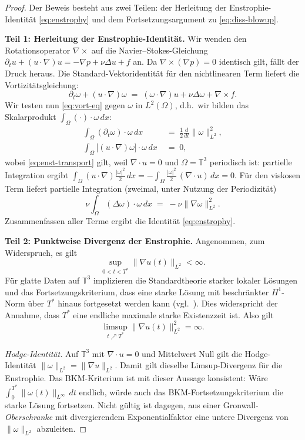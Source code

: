 \documentclass[12pt,a4paper]{article}
\theoremstyle{definition}
\theoremstyle{plain}
\theoremstyle{remark}
\begin{document}
\begin{proof}
Der Beweis besteht aus zwei Teilen: der Herleitung der Enstrophie-Identität
\eqref{eq:enstrophy} und dem Fortsetzungsargument zu \eqref{eq:diss-blowup}.

\medskip
\noindent\textbf{Teil 1: Herleitung der Enstrophie-Identität.}
Wir wenden den Rotationsoperator $\nabla\times$ auf die Navier--Stokes-Gleichung
$\partial_t u + (u\cdot\nabla)u = -\nabla p + \nu\Delta u + f$ an.
Da $\nabla\times(\nabla p) = 0$ identisch gilt, fällt der Druck heraus.
Die Standard-Vektoridentität für den nichtlinearen Term liefert die Vortizitätsgleichung:
\begin{equation}\label{eq:vort-eq}
    \partial_t \omega + (u\cdot\nabla)\omega
    \;=\; (\omega\cdot\nabla)u + \nu\Delta\omega + \nabla\times f.
\end{equation}
Wir testen nun \eqref{eq:vort-eq} gegen $\omega$ in $L^2(\Omega)$, d.h.\
wir bilden das Skalarprodukt $\int_\Omega (\cdot)\cdot\omega\,dx$:
\begin{align}
    \int_\Omega (\partial_t\omega)\cdot\omega\,dx
    &\;=\; \frac{1}{2}\frac{d}{dt}\|\omega\|_{L^2}^2, \label{eq:enst-lhs}\\[4pt]
    \int_\Omega \bigl[(u\cdot\nabla)\omega\bigr]\cdot\omega\,dx
    &\;=\; 0,\label{eq:enst-transport}
\end{align}
wobei \eqref{eq:enst-transport} gilt, weil $\nabla\cdot u = 0$ und
$\Omega = \mathbb{T}^3$ periodisch ist: partielle Integration ergibt
$\int_\Omega (u\cdot\nabla)\tfrac{|\omega|^2}{2}\,dx
= -\int_\Omega \tfrac{|\omega|^2}{2}\,(\nabla\cdot u)\,dx = 0$.
Für den viskosen Term liefert partielle Integration (zweimal, unter Nutzung der Periodizität)
\[
    \nu\int_\Omega (\Delta\omega)\cdot\omega\,dx
    \;=\; -\nu\|\nabla\omega\|_{L^2}^2.
\]
Zusammenfassen aller Terme ergibt die Identität \eqref{eq:enstrophy}.

\medskip
\noindent\textbf{Teil 2: Punktweise Divergenz der Enstrophie.}
Angenommen, zum Widerspruch, es gilt
\[
    \sup_{0<t<T^*}\|\nabla u(t)\|_{L^2} < \infty.
\]
Für glatte Daten auf $\mathbb{T}^3$ implizieren die Standardtheorie starker
lokaler Lösungen und das Fortsetzungskriterium, dass eine starke Lösung mit
beschränkter $H^1$-Norm über $T^*$ hinaus fortgesetzt werden kann
(vgl.\ \cite{ConstantinFoias1988}). Dies widerspricht der Annahme, dass
$T^*$ eine endliche maximale starke Existenzzeit ist. Also gilt
\[
    \limsup_{t\nearrow T^*}\|\nabla u(t)\|_{L^2}^2 = \infty.
\]

\smallskip
\noindent\emph{Hodge-Identität.}
Auf $\mathbb{T}^3$ mit $\nabla\cdot u = 0$ und Mittelwert Null gilt die Hodge-Identität
$\|\omega\|_{L^2} = \|\nabla u\|_{L^2}$.
Damit gilt dieselbe Limsup-Divergenz für die Enstrophie. Das BKM-Kriterium ist
mit dieser Aussage konsistent: Wäre
$\int_0^{T^*}\|\omega(t)\|_{L^\infty}\,dt$ endlich, würde auch das
BKM-Fortsetzungskriterium die starke Lösung fortsetzen. Nicht gültig ist
dagegen, aus einer Gronwall-\emph{Oberschranke} mit divergierendem
Exponentialfaktor eine untere Divergenz von $\|\omega\|_{L^2}$ abzuleiten.


\end{proof}
\end{document}
